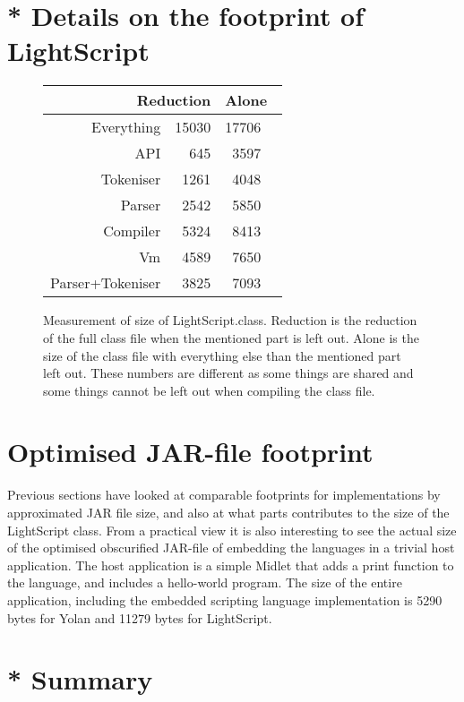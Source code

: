 \section{* Details on the footprint of LightScript}
\begin{figure}
\begin{center} \begin{tabular}{|r|r|rl|} \hline
\multicolumn{2}{|r|}{Reduction} & \multicolumn{2}{|l|}{Alone}\\ \hline
Everything & 15030 & 17706 & \\ \hline
API & 645  & 3597  & \\ \hline
Tokeniser & 1261 & 4048 & \\ \hline
Parser & 2542 & 5850 & \\ \hline
Compiler & 5324 & 8413 & \\ \hline
Vm & 4589 & 7650 & \\ \hline
Parser+Tokeniser & 3825 & 7093 & \\ \hline
\end{tabular} \end{center}
\caption{ Measurement of size of LightScript.class. Reduction is the reduction of the full class file when the mentioned part is left out. Alone is the size of the class file with everything else than the mentioned part left out. These numbers are different as some things are shared and some things cannot be left out when compiling the class file.}
\end{figure}

\section{Optimised JAR-file footprint}
Previous sections have looked at comparable footprints for implementations by approximated JAR file size, and also at what parts contributes to the size of the LightScript class.
From a practical view it is also interesting to see the actual size of the optimised obscurified JAR-file of embedding the languages in a trivial host application.
The host application is a simple Midlet that adds a print function to the language, and includes a hello-world program.
The size of the entire application, including the embedded scripting language implementation is 5290 bytes for Yolan and 11279 bytes for LightScript. 

\section{* Summary}
